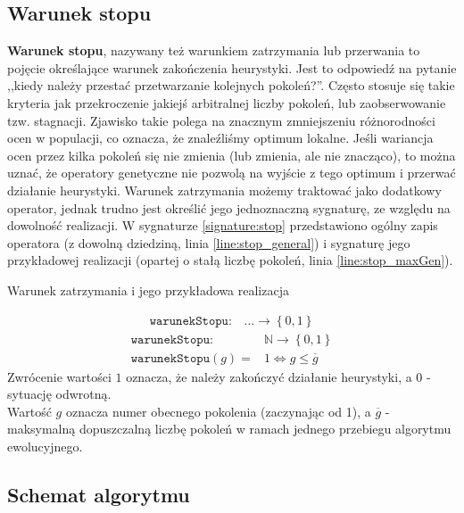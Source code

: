 \documentclass[twoside]{iisthesis}
\newcommand{\numberSet}{\mathbb}
\newcommand{\param}{\mathtt}
\begin{document}
\subsection{Warunek stopu} \label{subsection:stop}

\textbf{Warunek stopu}, nazywany też warunkiem zatrzymania lub przerwania to pojęcie określające warunek zakończenia heurystyki. Jest to odpowiedź na pytanie ,,kiedy należy przestać przetwarzanie kolejnych pokoleń?''. Często stosuje się takie kryteria jak przekroczenie jakiejś arbitralnej liczby pokoleń, lub zaobserwowanie tzw. stagnacji. Zjawisko takie polega na znacznym zmniejszeniu różnorodności ocen w populacji, co oznacza, że znaleźliśmy optimum lokalne. Jeśli wariancja ocen przez kilka pokoleń się nie zmienia (lub zmienia, ale nie znacząco), to można uznać, że operatory genetyczne nie pozwolą na wyjście z tego optimum i przerwać działanie heurystyki. 
Warunek zatrzymania możemy traktować jako dodatkowy operator, jednak trudno jest określić jego jednoznaczną sygnaturę, ze względu na dowolność realizacji. W sygnaturze \ref{signature:stop} przedstawiono ogólny zapis operatora (z dowolną dziedziną, linia \ref{line:stop_general}) i sygnaturę jego przykładowej realizacji (opartej o stałą liczbę pokoleń, linia \ref{line:stop_maxGen}).

\begin{signature}
	\caption{Warunek zatrzymania i jego przykładowa realizacja \label{signature:stop}} 
	\begin{align}
		\label{line:stop_general}
		\param{warunekStopu}: &\ldots \rightarrow \left\{ 0, 1 \right\}
	\end{align}
	\begin{align}
		\label{line:stop_maxGen}
		\param{warunekStopu}: &\numberSet{N} \rightarrow \left\{ 0, 1 \right\} \\
		\param{warunekStopu}(g) = &1 \Leftrightarrow g \leq \overline{g}
	\end{align}
	Zwrócenie wartości $1$ oznacza, że należy zakończyć działanie heurystyki, a $0$ - sytuację odwrotną. \\ 
	Wartość $g$ oznacza numer obecnego pokolenia (zaczynając od 1), a $\overline{g}$ - maksymalną dopuszczalną liczbę pokoleń w ramach jednego przebiegu algorytmu ewolucyjnego.
\end{signature}	

\subsection{Schemat algorytmu} \label{subsection:general_ea_scheme}
\end{document}
